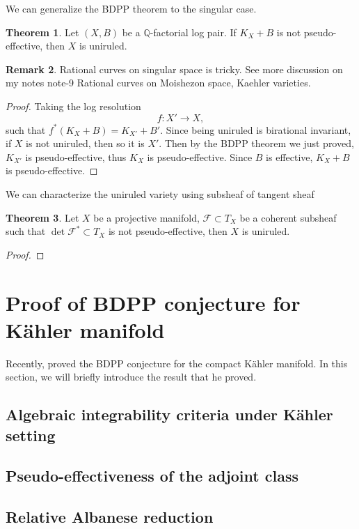 \documentclass[11pt]{article}
\theoremstyle{definition}
\newtheorem{theorem}{Theorem}
\newtheorem{remark}[theorem]{Remark}
\begin{document}
	We can generalize the BDPP theorem to the singular case.
	\begin{theorem}
		Let $(X,B)$ be a $\mathbb{Q}$-factorial log pair. If $K_X+B$ is not pseudo-effective, then $X$ is uniruled.
	\end{theorem}
	\begin{remark}
		Rational curves on singular space is tricky. See more discussion on my notes note-9 Rational curves on Moishezon space, Kaehler varieties.
	\end{remark}
	\begin{proof}
		Taking the log resolution $$f:X'\to X, $$such that $f^*(K_X+B) =  K_{X'}+B'$. Since being uniruled is birational invariant, if $X$ is not uniruled, then so it is $X'$. Then by the BDPP theorem we just proved, $K_{X'}$ is pseudo-effective, thus $K_X$ is pseudo-effective. Since $B$ is effective, $K_X+B$ is pseudo-effective. 
	\end{proof}
	We can characterize the uniruled variety using subsheaf of tangent sheaf
	\begin{theorem}
		Let $X$ be a projective manifold, $\mathscr{F}\subset T_X$ be a coherent subsheaf such that $\det{\mathscr{F}^*}\subset T_X$ is not pseudo-effective, then $X$ is uniruled.
	\end{theorem}
	\begin{proof}
		
	\end{proof}
	
	\section{Proof of BDPP conjecture for K\"ahler manifold}
	Recently, \cite{Ou} proved the BDPP conjecture for the compact K\"ahler manifold. In this section, we will briefly introduce the result that he proved.
	
	\subsection{Algebraic integrability criteria under K\"ahler setting}
	
	\subsection{Pseudo-effectiveness of the adjoint class}
	
	
	\subsection{Relative Albanese reduction}
	
\end{document}
